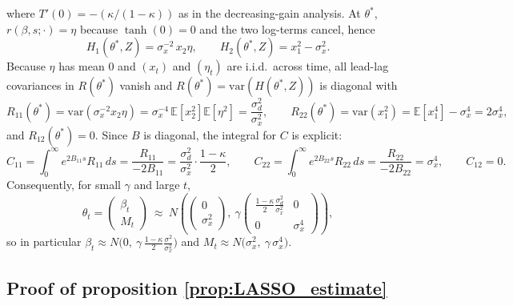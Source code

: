 \documentclass[11pt]{article}
\begin{document}
where $T'(0)=-(\kappa/(1-\kappa))$ as in the decreasing-gain analysis. At $\theta^*$, $r(\beta,s;\cdot)=\eta$ because $\tanh(0)=0$ and the two log-terms cancel, hence
\[
H_1(\theta^*,Z)=\sigma_x^{-2}\,x_2\eta,\qquad H_2(\theta^*,Z)=x_1^2-\sigma_x^2.
\]
Because $\eta$ has mean $0$ and $(x_t)$ and $(\eta_t)$ are i.i.d.\ across time, all lead-lag covariances in $R(\theta^*)$ vanish and $R(\theta^*)=\mathrm{var}(H(\theta^*,Z))$ is diagonal with
\[
R_{11}(\theta^*)=\mathrm{var}(\sigma_x^{-2}x_2\eta)=\sigma_x^{-4}\,\mathbb E[x_2^2]\mathbb E[\eta^2]=\frac{\sigma_d^2}{\sigma_x^{2}},\qquad
R_{22}(\theta^*)=\mathrm{var}(x_1^2)=\mathbb E[x_1^4]-\sigma_x^4=2\sigma_x^4,
\]
and $R_{12}(\theta^*)=0$. Since $B$ is diagonal, the integral for $C$ is explicit:
\[
C_{11}=\int_0^\infty e^{2B_{11}s}R_{11}\,ds=\frac{R_{11}}{-2B_{11}}=\frac{\sigma_d^2}{\sigma_x^{2}}\cdot\frac{1-\kappa}{2},\qquad
C_{22}=\int_0^\infty e^{2B_{22}s}R_{22}\,ds=\frac{R_{22}}{-2B_{22}}=\sigma_x^4,
\qquad C_{12}=0.
\]
Consequently, for small $\gamma$ and large $t$,
\[
\theta_t=
\begin{pmatrix}\beta_t\\ M_t\end{pmatrix}
\ \approx\ 
N\!\left(
\begin{pmatrix}0\\ \sigma_x^2\end{pmatrix},
\ \gamma
\begin{pmatrix}
\displaystyle \frac{1-\kappa}{2}\frac{\sigma_d^2}{\sigma_x^{2}} & 0\\[8pt]
0 & \sigma_x^4
\end{pmatrix}
\right),
\]
so in particular $\beta_t\approx N\!\bigl(0,\ \gamma\,\frac{1-\kappa}{2}\frac{\sigma^2}{\sigma_x^{2}}\bigr)$ and $M_t\approx N\!\bigl(\sigma_x^2,\ \gamma\,\sigma_x^4\bigr)$.

\subsection{Proof of proposition \ref{prop:LASSO_estimate}}  \label{app:proof_LASSO}
\end{document}

